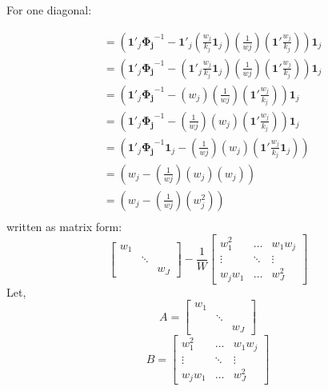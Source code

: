 For one diagonal:

\begin{equation}
    \begin{split}
         & = \left(\mathbf{1}'_j\mathbf{\Phi_j}^{-1}-\mathbf{1}'_j\left(\frac{w_j}{k_j}\mathbf{1}_j\right)\left(\frac{1}{wj}\right)\left(\mathbf{1}'\frac{w_j}{k_j}\right)\right)\mathbf{1}_j \\
         & = \left(\mathbf{1}'_j\mathbf{\Phi_j}^{-1}-\left(\mathbf{1}'_j\frac{w_j}{k_j}\mathbf{1}_j\right)\left(\frac{1}{wj}\right)\left(\mathbf{1}'\frac{w_j}{k_j}\right)\right)\mathbf{1}_j \\
         & = \left(\mathbf{1}'_j\mathbf{\Phi_j}^{-1}-\left(w_j\right)\left(\frac{1}{wj}\right)\left(\mathbf{1}'\frac{w_j}{k_j}\right)\right)\mathbf{1}_j \\
         & = \left(\mathbf{1}'_j\mathbf{\Phi_j}^{-1}-\left(\frac{1}{wj}\right)\left(w_j\right)\left(\mathbf{1}'\frac{w_j}{k_j}\right)\right)\mathbf{1}_j \\
         & = \left(\mathbf{1}'_j\mathbf{\Phi_j}^{-1}\mathbf{1}_j -\left(\frac{1}{wj}\right)\left(w_j\right)\left(\mathbf{1}'\frac{w_j}{k_j}\mathbf{1}_j \right)\right)\\
         & = \left(w_j -\left(\frac{1}{wj}\right)\left(w_j\right)\left(w_j \right)\right)\\
         & = \left(w_j -\left(\frac{1}{wj}\right)\left( w_j^2 \right)\right)\\
    \end{split}
    \nonumber
\end{equation}
written as matrix form:
\begin{equation}
     \begin{bmatrix}
        w_1 & &   \\
         &  \ddots &  \\
         & &   w_J
    \end{bmatrix} - \frac{1}{W}
     \begin{bmatrix}
         w_1^2 & \dots & w_1w_j  \\
         \vdots & \ddots & \vdots \\
         w_jw_1 & \dots &  w_J^2
    \end{bmatrix} 
    \nonumber
\end{equation}
Let,
\begin{equation}
     A = \begin{bmatrix}
        w_1 & &   \\
         &  \ddots &  \\
         & &   w_J
    \end{bmatrix} 
    \nonumber
\end{equation}
\begin{equation}
     B = \begin{bmatrix}
         w_1^2 & \dots & w_1w_j  \\
         \vdots & \ddots & \vdots \\
         w_jw_1 & \dots &  w_J^2
    \end{bmatrix}  
    \nonumber
\end{equation}

